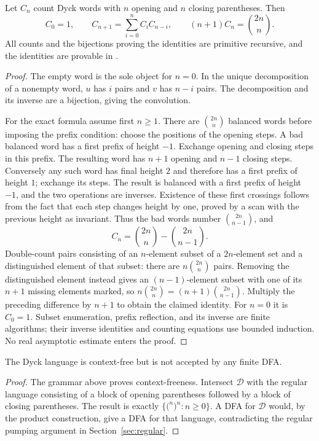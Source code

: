 \begin{theorem}
\label{count:catalan}
Let $C_n$ count Dyck words with $n$ opening and $n$ closing parentheses.
Then
\[
 C_0=1,\qquad C_{n+1}=\sum_{i=0}^{n}C_iC_{n-i},\qquad
 (n+1)C_n=\binom{2n}{n}.
\]
All counts and the bijections proving the identities are primitive
recursive, and the identities are provable in \ipra.
\end{theorem}
\begin{proof}
The empty word is the sole object for $n=0$. In the unique decomposition
of a nonempty word, $u$ has $i$ pairs and $v$ has $n-i$ pairs. The
decomposition and its inverse are a bijection, giving the convolution.

For the exact formula assume first $n\ge1$. There are $\binom{2n}{n}$
balanced words before imposing the prefix condition: choose the positions
of the opening steps. A bad balanced word has a first prefix of height
$-1$. Exchange opening and closing steps in this prefix. The resulting
word has $n+1$ opening and $n-1$ closing steps. Conversely any such word
has final height $2$ and therefore has a first prefix of height $1$;
exchange its steps. The result is balanced with a first prefix of height
$-1$, and the two operations are inverses. Existence of these first
crossings follows from the fact that each step changes height by one,
proved by a scan with the previous height as invariant. Thus the bad
words number $\binom{2n}{n-1}$, and
\[
 C_n=\binom{2n}{n}-\binom{2n}{n-1}.
\]
Double-count pairs consisting of an $n$-element subset of a $2n$-element
set and a distinguished element of that subset: there are
$n\binom{2n}{n}$ pairs. Removing the distinguished element instead gives
an $(n-1)$-element subset with one of its $n+1$ missing elements marked,
so $n\binom{2n}{n}=(n+1)\binom{2n}{n-1}$. Multiply the preceding
difference by $n+1$ to obtain the claimed identity. For $n=0$ it is
$C_0=1$. Subset enumeration, prefix reflection, and its inverse are
finite algorithms; their inverse identities and counting equations use
bounded induction. No real asymptotic estimate enters the proof.
\end{proof}

\begin{corollary}
\label{count:dycknonreg}
The Dyck language is context-free but is not accepted by any finite DFA.
\end{corollary}
\begin{proof}
The grammar above proves context-freeness. Intersect $\mathcal D$ with
the regular language consisting of a block of opening parentheses followed
by a block of closing parentheses. The result is exactly
$\{\mathtt{(}^n\mathtt{)}^n:n\ge0\}$. A DFA for $\mathcal D$ would,
by the product construction, give a DFA for that language, contradicting
the regular pumping argument in Section~\ref{sec:regular}.
\end{proof}

